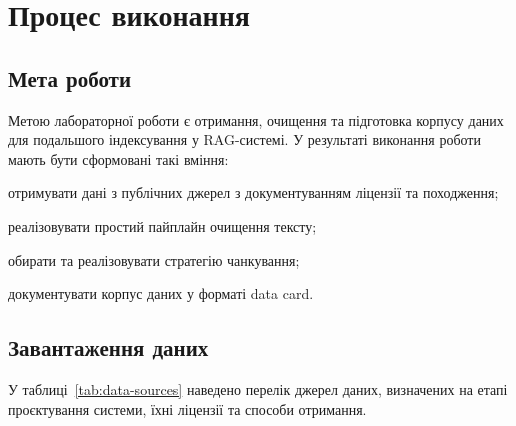\chapter{Процес виконання}
\section{Мета роботи}
Метою лабораторної роботи є отримання, очищення та підготовка корпусу даних для подальшого індексування у RAG-системі. У результаті виконання роботи мають бути сформовані такі вміння:
\begin{dashlist}[wide]
    \item отримувати дані з публічних джерел з документуванням ліцензії та походження;
    \item реалізовувати простий пайплайн очищення тексту;
    \item обирати та реалізовувати стратегію чанкування;
    \item документувати корпус даних у форматі data card.
\end{dashlist}

\section{Завантаження даних}

У таблиці~\ref{tab:data-sources} наведено перелік джерел даних, визначених на етапі проєктування системи, їхні ліцензії та способи отримання.

